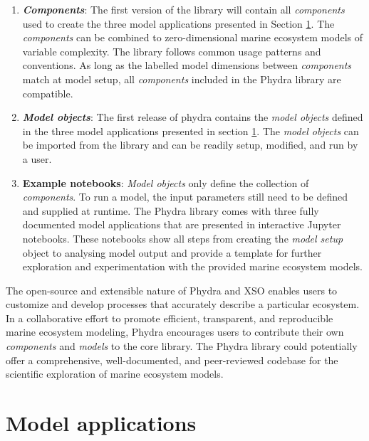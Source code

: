 \documentclass[journal abbreviation, manuscript]{copernicus}
\begin{document}
\begin{enumerate}
    \item \textbf{\textit{Components}}: The first version of the library will contain all \textit{components} used to create the three model applications presented in Section \ref{Section:UseCases}. The \textit{components} can be combined to zero-dimensional marine ecosystem models of variable complexity. The library follows common usage patterns and conventions. As long as the labelled model dimensions between \textit{components} match at model setup, all \textit{components} included in the Phydra library are compatible.
    
    \item \textbf{\textit{Model objects}}: The first release of phydra contains the \textit{model objects} defined in the three model applications presented in section \ref{Section:UseCases}. The \textit{model objects} can be imported from the library and can be readily setup, modified, and run by a user.
    
    \item \textbf{Example notebooks}: \textit{Model objects} only define the collection of \textit{components}. To run a model, the input parameters still need to be defined and supplied at runtime. The Phydra library comes with three fully documented model applications that are presented in interactive Jupyter notebooks. These notebooks show all steps from creating the \textit{model setup} object to analysing model output and provide a template for further exploration and experimentation with the provided marine ecosystem models.
    
\end{enumerate}

The open-source and extensible nature of Phydra and XSO enables users to customize and develop processes that accurately describe a particular ecosystem. In a collaborative effort to promote efficient, transparent, and reproducible marine ecosystem modeling, Phydra encourages users to contribute their own \textit{components} and \textit{models} to the core library. The Phydra library could potentially offer a comprehensive, well-documented, and peer-reviewed codebase for the scientific exploration of marine ecosystem models.







\section{Model applications} \label{Section:UseCases}
\end{document}
